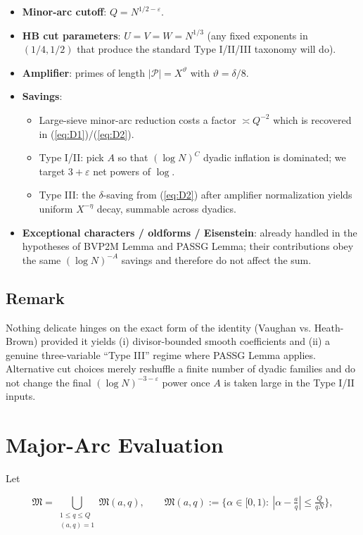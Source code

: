 \documentclass[11pt]{article}
\def\eqref#1{(\ref{#1})}%
\theoremstyle{definition}
\theoremstyle{remark}
\numberwithin{equation}{part}
\begin{document}
\begin{itemize}
	\item \textbf{Minor-arc cutoff}: $Q=N^{1/2-\varepsilon}$.
	\item \textbf{HB cut parameters}: $U=V=W=N^{1/3}$ (any fixed exponents in $(1/4,1/2)$ that produce the standard Type I/II/III taxonomy will do).
	\item \textbf{Amplifier}: primes of length $|\mathcal P|=X^\vartheta$ with $\vartheta=\delta/8$.
	\item \textbf{Savings}:
	      \begin{itemize}
		      \item Large-sieve minor-arc reduction costs a factor $\asymp Q^{-2}$ which is recovered in \eqref{eq:D1}/\eqref{eq:D2}.
		      \item Type I/II: pick $A$ so that $(\log N)^C$ dyadic inflation is dominated; we target $3+\varepsilon$ net powers of $\log$.
		      \item Type III: the $\delta$-saving from \eqref{eq:D2} after amplifier normalization yields uniform $X^{-\eta}$ decay, summable across dyadics.
	      \end{itemize}
	\item \textbf{Exceptional characters / oldforms / Eisenstein}: already handled in the hypotheses of BVP2M Lemma and PASSG Lemma; their contributions obey the same $(\log N)^{-A}$ savings and therefore do not affect the sum.
\end{itemize}

\subsection{Remark}

Nothing delicate hinges on the exact form of the identity (Vaughan vs. Heath-Brown) provided it yields (i) divisor-bounded smooth coefficients and (ii) a genuine three-variable “Type III” regime where PASSG Lemma applies. Alternative cut choices merely reshuffle a finite number of dyadic families and do not change the final $(\log N)^{-3-\varepsilon}$ power once $A$ is taken large in the Type I/II inputs.

\section{Major-Arc Evaluation}

Let

$$
	\mathfrak M=\bigcup_{\substack{1\le q\le Q\\(a,q)=1}}\mathfrak M(a,q),\qquad
	\mathfrak M(a,q):=\{\alpha\in[0,1):\ |\alpha-\tfrac aq|\le \tfrac{Q}{qN}\},
$$
\end{document}

